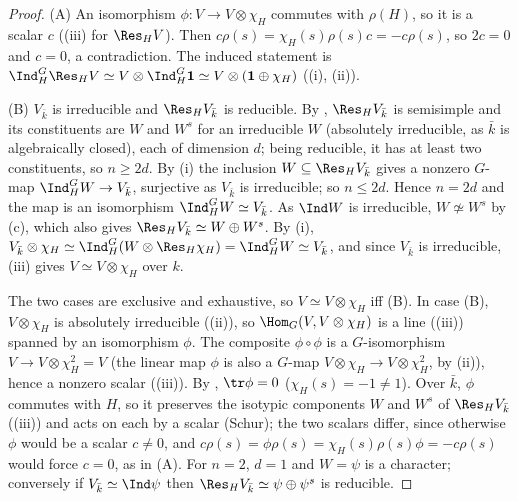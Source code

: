 \begin{proof}
(A) An isomorphism $\phi\colon V\to V\otimes\chi_H$ commutes with $\rho(H)$, so it is a scalar $c$ ((iii) for $\Res_HV$). Then
$c\rho(s)=\chi_H(s)\rho(s)c=-c\rho(s)$, so $2c=0$ and $c=0$, a contradiction. The induced statement is
$\Ind_H^G\Res_HV\simeq V\otimes\Ind_H^G\mathbf1\simeq V\otimes(\mathbf1\oplus\chi_H)$ ((i), (ii)).

(B) $V_{\bar k}$ is irreducible and $\Res_HV_{\bar k}$ is reducible. By , $\Res_HV_{\bar k}$ is semisimple and its constituents are
$W$ and $W^s$ for an irreducible $W$ (absolutely irreducible, as $\bar k$ is algebraically closed), each of dimension $d$; being reducible, it
has at least two constituents, so $n\ge2d$. By (i) the inclusion $W\subseteq\Res_HV_{\bar k}$ gives a nonzero $G$-map
$\Ind_H^GW\to V_{\bar k}$, surjective as $V_{\bar k}$ is irreducible; so $n\le2d$. Hence $n=2d$ and the map is an isomorphism $\Ind_H^GW\simeq V_{\bar k}$. As
$\Ind W$ is irreducible, $W\not\simeq W^s$ by (c), which also gives $\Res_HV_{\bar k}\simeq W\oplus W^s$. By
(i), $V_{\bar k}\otimes\chi_H\simeq\Ind_H^G(W\otimes\Res_H\chi_H)=\Ind_H^GW\simeq V_{\bar k}$, and since $V_{\bar k}$ is irreducible,
(iii) gives $V\simeq V\otimes\chi_H$ over $k$.

The two cases are exclusive and exhaustive, so $V\simeq V\otimes\chi_H$ iff (B). In case (B), $V\otimes\chi_H$ is absolutely irreducible
((ii)), so $\Hom_G(V,V\otimes\chi_H)$ is a line ((iii)) spanned by an isomorphism $\phi$. The composite
$\phi\circ\phi$ is a $G$-isomorphism $V\to V\otimes\chi_H^2=V$ (the linear map $\phi$ is also a $G$-map $V\otimes\chi_H\to V\otimes\chi_H^2$, by
(ii)), hence a nonzero scalar ((iii)). By , $\tr\phi=0$ ($\chi_H(s)=-1\ne1$). Over
$\bar k$, $\phi$ commutes with $H$, so it preserves the isotypic components $W$ and $W^s$ of $\Res_HV_{\bar k}$ ((iii)) and acts on
each by a scalar (Schur); the two scalars differ, since otherwise $\phi$ would be a scalar $c\ne0$, and
$c\rho(s)=\phi\rho(s)=\chi_H(s)\rho(s)\phi=-c\rho(s)$ would force $c=0$, as in (A). For $n=2$, $d=1$ and $W=\psi$ is a
character; conversely if $V_{\bar k}\simeq\Ind\psi$ then $\Res_HV_{\bar k}\simeq\psi\oplus\psi^s$ is reducible.
\end{proof}

